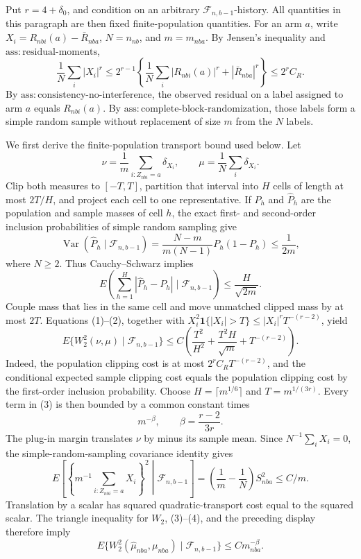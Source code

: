 Put \(r=4+\delta_0\), and condition on an arbitrary \(\mathcal F_{n,b-1}\)-history. All quantities in this paragraph are then fixed finite-population quantities. For an arm \(a\), write \(X_i=R_{nbi}(a)-\bar R_{nba}\), \(N=n_{nb}\), and \(m=m_{nba}\). By Jensen's inequality and \(\mathrm{ass:residual\text{-}moments}\),
\[
 \frac1N\sum_i|X_i|^r
 \le 2^{r-1}\left\{\frac1N\sum_i|R_{nbi}(a)|^r+|\bar R_{nba}|^r\right\}
 \le 2^r C_R. \tag{1}
\]
By \(\mathrm{ass:consistency\text{-}no\text{-}interference}\), the observed residual on a label assigned to arm \(a\) equals \(R_{nbi}(a)\). By \(\mathrm{ass:complete\text{-}block\text{-}randomization}\), those labels form a simple random sample without replacement of size \(m\) from the \(N\) labels.

We first derive the finite-population transport bound used below. Let
\[
 \nu=\frac1m\sum_{i:Z_{nbi}=a}\delta_{X_i},
 \qquad
 \mu=\frac1N\sum_i\delta_{X_i}.
\]
Clip both measures to \([-T,T]\), partition that interval into \(H\) cells of length at most \(2T/H\), and project each cell to one representative. If \(P_h\) and \(\widehat P_h\) are the population and sample masses of cell \(h\), the exact first- and second-order inclusion probabilities of simple random sampling give
\[
 \operatorname{Var}(\widehat P_h\mid\mathcal F_{n,b-1})
 =\frac{N-m}{m(N-1)}P_h(1-P_h)\le\frac1{2m},
\]
where \(N\ge2\). Thus Cauchy--Schwarz implies
\[
 E\!\left(\sum_{h=1}^H|\widehat P_h-P_h|\mid\mathcal F_{n,b-1}\right)
 \le \frac{H}{\sqrt{2m}}. \tag{2}
\]
Couple mass that lies in the same cell and move unmatched clipped mass by at most \(2T\). Equations (1)--(2), together with \(X_i^2\mathbf 1\{|X_i|>T\}\le |X_i|^rT^{-(r-2)}\), yield
\[
 E\{W_2^2(\nu,\mu)\mid\mathcal F_{n,b-1}\}
 \le C\left(\frac{T^2}{H^2}+\frac{T^2H}{\sqrt m}+T^{-(r-2)}\right). \tag{3}
\]
Indeed, the population clipping cost is at most \(2^rC_RT^{-(r-2)}\), and the conditional expected sample clipping cost equals the population clipping cost by the first-order inclusion probability. Choose \(H=\lceil m^{1/6}\rceil\) and \(T=m^{1/(3r)}\). Every term in (3) is then bounded by a common constant times
\[
 m^{-\beta},\qquad \beta=\frac{r-2}{3r}. \tag{4}
\]
The plug-in margin translates \(\nu\) by minus its sample mean. Since \(N^{-1}\sum_iX_i=0\), the simple-random-sampling covariance identity gives
\[
 E\left[\left\{m^{-1}\sum_{i:Z_{nbi}=a}X_i\right\}^2\middle|\mathcal F_{n,b-1}\right]
 =\left(\frac1m-\frac1N\right)S_{nba}^2\le C/m.
\]
Translation by a scalar has squared quadratic-transport cost equal to the squared scalar. The triangle inequality for \(W_2\), (3)--(4), and the preceding display therefore imply
\[
 E\{W_2^2(\widehat\mu_{nba},\mu_{nba})\mid\mathcal F_{n,b-1}\}
 \le C m_{nba}^{-\beta}. \tag{5}
\]

